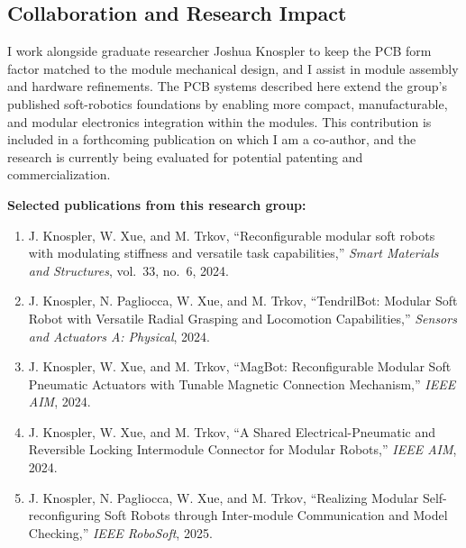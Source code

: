 \documentclass[10pt,letterpaper]{article}
\begin{document}
\subsection*{Collaboration and Research Impact}

I work alongside graduate researcher Joshua Knospler to keep the PCB
form factor matched to the module mechanical design, and I assist in
module assembly and hardware refinements. The PCB systems described here
extend the group's published soft-robotics foundations by enabling more
compact, manufacturable, and modular electronics integration within the
modules. This contribution is included in a forthcoming publication on
which I am a co-author, and the research is currently being evaluated
for potential patenting and commercialization.

\vspace{4pt}
{\footnotesize
\textbf{Selected publications from this research group:}
\begin{enumerate}[leftmargin=1.6em,itemsep=1pt]
  \item J. Knospler, W. Xue, and M. Trkov, ``Reconfigurable modular soft
        robots with modulating stiffness and versatile task
        capabilities,'' \textit{Smart Materials and Structures}, vol.~33,
        no.~6, 2024.
  \item J. Knospler, N. Pagliocca, W. Xue, and M. Trkov, ``TendrilBot:
        Modular Soft Robot with Versatile Radial Grasping and Locomotion
        Capabilities,'' \textit{Sensors and Actuators A: Physical}, 2024.
  \item J. Knospler, W. Xue, and M. Trkov, ``MagBot: Reconfigurable
        Modular Soft Pneumatic Actuators with Tunable Magnetic Connection
        Mechanism,'' \textit{IEEE AIM}, 2024.
  \item J. Knospler, W. Xue, and M. Trkov, ``A Shared
        Electrical-Pneumatic and Reversible Locking Intermodule Connector
        for Modular Robots,'' \textit{IEEE AIM}, 2024.
  \item J. Knospler, N. Pagliocca, W. Xue, and M. Trkov, ``Realizing
        Modular Self-reconfiguring Soft Robots through Inter-module
        Communication and Model Checking,'' \textit{IEEE RoboSoft}, 2025.
\end{enumerate}}

\end{document}
